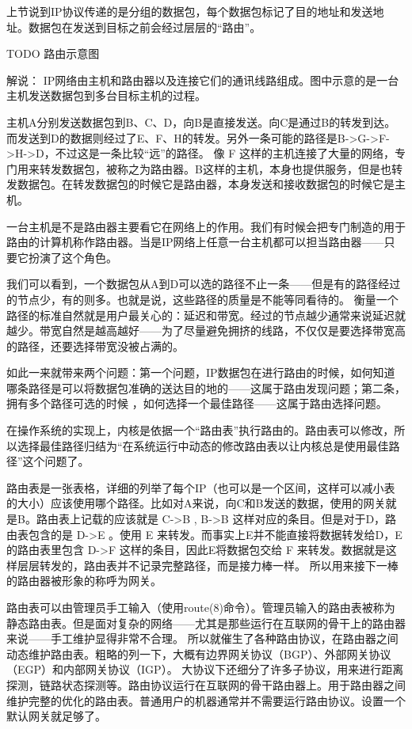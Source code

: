 上节说到IP协议传递的是分组的数据包，每个数据包标记了目的地址和发送地址。数据包在发送到目标之前会经过层层的“路由”。

TODO 路由示意图

解说： IP网络由主机和路由器以及连接它们的通讯线路组成。图中示意的是一台主机发送数据包到多台目标主机的过程。

主机A分别发送数据包到B、C、D，向B是直接发送。向C是通过B的转发到达。而发送到D的数据则经过了E、F、H的转发。另外一条可能的路径是B->G->F->H->D，不过这是一条比较“远”的路径。
像 F 这样的主机连接了大量的网络，专门用来转发数据包，被称之为路由器。B这样的主机，本身也提供服务，但是也转发数据包。在转发数据包的时候它是路由器，本身发送和接收数据包的时候它是主机。

一台主机是不是路由器主要看它在网络上的作用。我们有时候会把专门制造的用于路由的计算机称作路由器。当是IP网络上任意一台主机都可以担当路由器——只要它扮演了这个角色。

我们可以看到，一个数据包从A到D可以选的路径不止一条——但是有的路径经过的节点少，有的则多。也就是说，这些路径的质量是不能等同看待的。
衡量一个路径的标准自然就是用户最关心的：延迟和带宽。经过的节点越少通常来说延迟就越少。带宽自然是越高越好——为了尽量避免拥挤的线路，不仅仅是要选择带宽高的路径，还要选择带宽没被占满的。

如此一来就带来两个问题：第一个问题，IP数据包在进行路由的时候，如何知道哪条路径是可以将数据包准确的送达目的地的——这属于路由发现问题；第二条，拥有多个路径可选的时候 ，如何选择一个最佳路径——这属于路由选择问题。

在操作系统的实现上，内核是依据一个“路由表”执行路由的。路由表可以修改，所以选择最佳路径归结为“在系统运行中动态的修改路由表以让内核总是使用最佳路径”这个问题了。

路由表是一张表格，详细的列举了每个IP（也可以是一个区间，这样可以减小表的大小）应该使用哪个路径。比如对A来说，向C和B发送的数据，使用的网关就是B。路由表上记载的应该就是 C->B , B->B 这样对应的条目。但是对于D，路由表包含的是 D->E 。使用 E 来转发。而事实上E并不能直接将数据转发给D，E 的路由表里包含 D->F 这样的条目，因此E将数据包交给 F 来转发。数据就是这样层层转发的，路由表并不记录完整路径，而是接力棒一样。
所以用来接下一棒的路由器被形象的称呼为网关。

路由表可以由管理员手工输入（使用route(8)命令）。管理员输入的路由表被称为静态路由表。但是面对复杂的网络——尤其是那些运行在互联网的骨干上的路由器来说——手工维护显得非常不合理。
所以就催生了各种路由协议，在路由器之间动态维护路由表。粗略的列一下，大概有边界网关协议（BGP）、外部网关协议（EGP）和内部网关协议（IGP）。
大协议下还细分了许多子协议，用来进行距离探测，链路状态探测等。路由协议运行在互联网的骨干路由器上。用于路由器之间维护完整的优化的路由表。普通用户的机器通常并不需要运行路由协议。设置一个默认网关就足够了。

